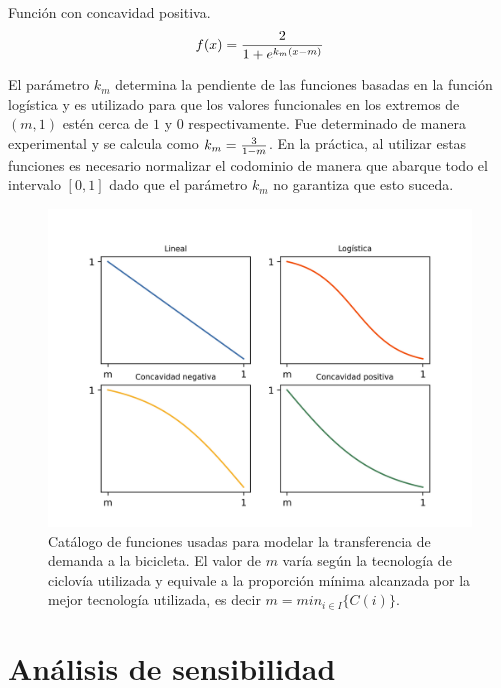 \begin{definition}
  Función con concavidad positiva.
  \begin{align}
      f(x) = {2 \over 1 + e^{k_m(x - m)}}
  \end{align}
\end{definition}

El parámetro $k_m$ determina la pendiente de las funciones basadas en la función logística y es utilizado para que los valores funcionales en los extremos de $(m, 1)$ estén cerca de $1$ y $0$ respectivamente. Fue determinado de manera experimental y se calcula como $k_m = {3 \over 1 - m}$. En la práctica, al utilizar estas funciones es necesario normalizar el codominio de manera que abarque todo el intervalo $[0, 1]$ dado que el parámetro $k_m$ no garantiza que esto suceda.

\begin{figure}[h!]
  \centering
  \includegraphics[width=14cm]{../resources/f_catalog.png}
    \caption{Catálogo de funciones usadas para modelar la transferencia de demanda a la bicicleta. El valor de $m$ varía según la tecnología de ciclovía utilizada y equivale a la proporción mínima alcanzada por la mejor tecnología utilizada, es decir $m = min_{i \in I} \{ C(i) \}$.}
  \label{fig:fcatalog}
\end{figure}

\FloatBarrier
\section{Análisis de sensibilidad}
\label{sect:sensibilityanalysis}

